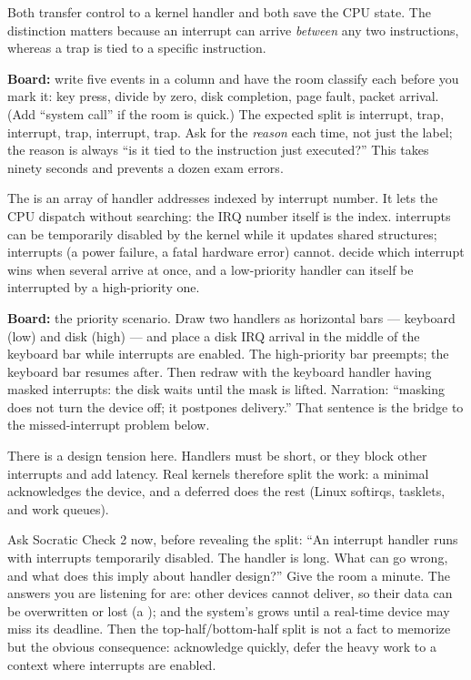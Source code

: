 \documentclass[11pt]{article}
\begin{document}
Both transfer control to a kernel handler and both save the CPU state. The
distinction matters because an interrupt can arrive \emph{between} any two
instructions, whereas a trap is tied to a specific instruction.

\textbf{Board:} write five events in a column and have the room classify each
before you mark it: key press, divide by zero, disk completion, page fault,
packet arrival. (Add ``system call'' if the room is quick.) The expected split is
interrupt, trap, interrupt, trap, interrupt, trap. Ask for the \emph{reason} each
time, not just the label; the reason is always ``is it tied to the instruction
just executed?'' This takes ninety seconds and prevents a dozen exam errors.

The  is an array of handler addresses indexed by
interrupt number. It lets the CPU dispatch without searching: the IRQ number
itself is the index.  interrupts can be temporarily disabled by the
kernel while it updates shared structures;  interrupts (a power
failure, a fatal hardware error) cannot.  decide which
interrupt wins when several arrive at once, and a low-priority handler can itself
be interrupted by a high-priority one.

\textbf{Board:} the priority scenario. Draw two handlers as horizontal bars ---
keyboard (low) and disk (high) --- and place a disk IRQ arrival in the middle of
the keyboard bar while interrupts are enabled. The high-priority bar preempts;
the keyboard bar resumes after. Then redraw with the keyboard handler having
masked interrupts: the disk waits until the mask is lifted. Narration: ``masking
does not turn the device off; it postpones delivery.'' That sentence is the
bridge to the missed-interrupt problem below.

There is a design tension here. Handlers must be short, or they block other
interrupts and add latency. Real kernels therefore split the work: a minimal
 acknowledges the device, and a deferred  does the
rest (Linux softirqs, tasklets, and work queues).

Ask Socratic Check 2 now, before revealing the split: ``An interrupt handler runs
with interrupts temporarily disabled. The handler is long. What can go wrong, and
what does this imply about handler design?'' Give the room a minute. The answers
you are listening for are: other devices cannot deliver, so their data can be
overwritten or lost (a ); and the system's
 grows until a real-time device may miss its deadline.
Then the top-half/bottom-half split is not a fact to memorize but the obvious
consequence: acknowledge quickly, defer the heavy work to a context where
interrupts are enabled.
\end{document}
